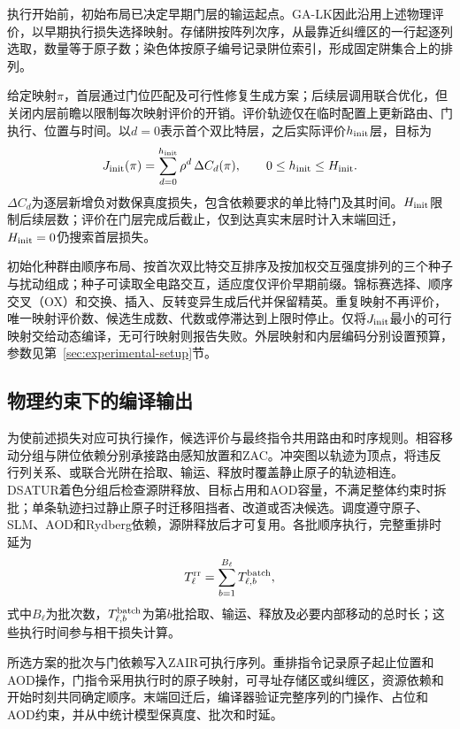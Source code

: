 执行开始前，初始布局已决定早期门层的输运起点。GA-LK因此沿用上述物理评价，以早期执行损失选择映射。存储阱按阵列次序，从最靠近纠缠区的一行起逐列选取，数量等于原子数；染色体按原子编号记录阱位索引，形成固定阱集合上的排列。

给定映射$\pi$，首层通过门位匹配及可行性修复生成方案；后续层调用联合优化，但关闭内层前瞻以限制每次映射评价的开销。评价轨迹仅在临时配置上更新路由、门执行、位置与时间。以$d=0$表示首个双比特层，之后实际评价$h_{\rm init}$层，目标为
\begin{equation}
J_{\rm init}(\pi)=
\sum_{d=0}^{h_{\rm init}}\rho^d\,\Delta C_d(\pi),
\qquad 0\le h_{\rm init}\le H_{\rm init}.
\label{eq:initial-lookahead}
\end{equation}
$\Delta C_d$为逐层新增负对数保真度损失，包含依赖要求的单比特门及其时间。$H_{\rm init}$限制后续层数；评价在门层完成后截止，仅到达真实末层时计入末端回迁，$H_{\rm init}=0$仍搜索首层损失。

初始化种群由顺序布局、按首次双比特交互排序及按加权交互强度排列的三个种子与扰动组成；种子可读取全电路交互，适应度仅评价早期前缀。锦标赛选择、顺序交叉（OX）和交换、插入、反转变异生成后代并保留精英。重复映射不再评价，唯一映射评价数、候选生成数、代数或停滞达到上限时停止。仅将$J_{\rm init}$最小的可行映射交给动态编译，无可行映射则报告失败。外层映射和内层编码分别设置预算，参数见第~\ref{sec:experimental-setup}节。

\subsection{物理约束下的编译输出}
\label{sec:routing}

为使前述损失对应可执行操作，候选评价与最终指令共用路由和时序规则。相容移动分组与阱位依赖分别承接路由感知放置和ZAC\cite{stade2025routingaware,lin2025zac}。冲突图以轨迹为顶点，将违反行列关系、或联合光阱在拾取、输运、释放时覆盖静止原子的轨迹相连。DSATUR着色\cite{brelaz1979coloring}分组后检查源阱释放、目标占用和AOD容量，不满足整体约束时拆批；单条轨迹扫过静止原子时迁移阻挡者、改道或否决候选。调度遵守原子、SLM、AOD和Rydberg依赖，源阱释放后才可复用。各批顺序执行，完整重排时延为
\begin{equation}
T_\ell^{\rm rr}=\sum_{b=1}^{B_\ell}T_{\ell,b}^{\rm batch},
\label{eq:rearrangement-metrics}
\end{equation}
式中$B_\ell$为批次数，$T_{\ell,b}^{\rm batch}$为第$b$批拾取、输运、释放及必要内部移动的总时长；这些执行时间参与相干损失计算。

所选方案的批次与门依赖写入ZAIR可执行序列\cite{lin2025zac}。重排指令记录原子起止位置和AOD操作，门指令采用执行时的原子映射，可寻址存储区或纠缠区，资源依赖和开始时刻共同确定顺序。末端回迁后，编译器验证完整序列的门操作、占位和AOD约束，并从中统计模型保真度、批次和时延。
